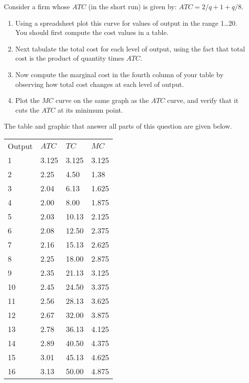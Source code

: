\begin{enumialphparenastyle}
\begin{ex}\label{ex:ch8ex12}
Consider a firm whose $ATC$ (in the short run) is given by: $ATC=2/q+1+q/8$.
\begin{enumerate}
	\item	Using a spreadsheet plot this curve for values of output in the range 1\dots 20. You should first compute the cost values in a table.
	\item	Next tabulate the total cost for each level of output, using the fact that total cost is the product of quantity times $ATC$.
	\item	Now compute the marginal cost in the fourth column of your table by observing how total cost changes at each level of output.
	\item	Plot the $MC$ curve on the same graph as the $ATC$ curve, and verify that it cuts the $ATC$ at its minimum point.
\end{enumerate}
\begin{sol}
	The table and graphic that answer all parts of this question are given below.
\begin{center}
	\begin{tabu} to \linewidth {|X[1,c]X[1,c]X[1,c]X[1,c]|}	\hline
		 Output & $ATC$ & $TC$ & $MC$ \\
							1	&	3.125	&	3.125	&	3.125	\\
		2	&	2.25	&	4.50	&	1.38	\\
							3	&	2.04	&	6.13	&	1.625	\\
		4	&	2.00	&	8.00	&	1.875	\\
							5	&	2.03	&	10.13	&	2.125	\\
		6	&	2.08	&	12.50	&	2.375	\\
							7	&	2.16	&	15.13	&	2.625	\\
		8	&	2.25	&	18.00	&	2.875	\\
							9	&	2.35	&	21.13	&	3.125	\\
		10	&	2.45	&	24.50	&	3.375	\\
							11	&	2.56	&	28.13	&	3.625	\\
		12	&	2.67	&	32.00	&	3.875	\\
							13	&	2.78	&	36.13	&	4.125	\\
		14	&	2.89	&	40.50	&	4.375	\\
							15	&	3.01	&	45.13	&	4.625	\\
		16	&	3.13	&	50.00	&	4.875	\\

\end{tabu}
\end{center}
\end{sol}
\end{ex}
\end{enumialphparenastyle}
